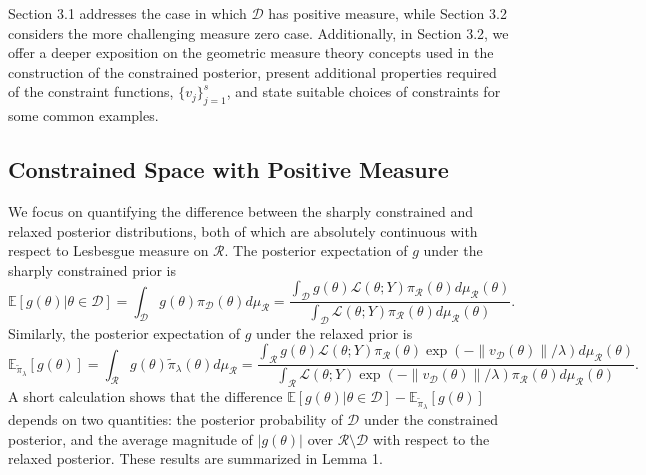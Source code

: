 \documentclass[10pt,fleqn]{article}
\newcommand{\bb}[1]{\mathbb{#1}} \newcommand{\mc}[1]{\mathcal{#1}}
\DeclareMathOperator{\1}{\mathbbm{1}} \DeclareMathOperator{\bigO}{\mc O}
\begin{document}
Section 3.1 addresses the case in which $\mc D$ has positive measure, while Section 3.2 considers the more challenging measure zero case. Additionally, in Section 3.2, we offer a deeper exposition on the geometric measure theory concepts used in the construction of the constrained posterior, present additional properties required of the constraint functions, $\{v_j\}_{j=1}^s$, and state suitable choices of constraints for some common examples.

\subsection{Constrained Space with Positive Measure} \label{SEC:Positive_measure_theory}


We focus on quantifying the difference between the sharply constrained and relaxed posterior distributions, 
both of which are absolutely continuous with respect to Lesbesgue measure on $\mathcal{R}$.  The posterior expectation of $g$ under the sharply constrained prior is 
\begin{equation}
\label{EQ:Expectation_Positive_Measure_Constraint} \bb
E[g(\theta)|\theta\in\mathcal{D}] = \int_\mathcal{D}
g(\theta)\pi_\mathcal{D}(\theta)d\mu_\mathcal{R} =
\frac{\int_\mathcal{D} g(\theta)\mathcal{L}(\theta; Y)
\pi_\mathcal{R}(\theta)d\mu_\mathcal{R}(\theta)}{\int_\mathcal{D}
\mathcal{L}(\theta; Y)
\pi_\mathcal{R}(\theta)d\mu_\mathcal{R}(\theta)}.
\end{equation}
Similarly, the posterior expectation of $g$ under the relaxed prior is
\begin{equation} \label{EQ:Expectation_Positive_Measure_Relaxed}
\bb E_{\tilde{\pi}_\lambda}[g(\theta)] = \int_\mathcal{R}
g(\theta)\tilde{\pi}_\lambda(\theta)d\mu_\mathcal{R} =
\frac{\int_\mathcal{R} g(\theta)\mathcal{L}(\theta; Y)
\pi_\mathcal{R}(\theta)
\exp(-\|v_{\mc
D}(\theta)\|/\lambda)d\mu_\mathcal{R}(\theta)}{\int_\mathcal{R}
\mathcal{L}(\theta; Y)\exp(-\| v_{\mc D}(\theta)\|/\lambda)
\pi_\mathcal{R}(\theta)d\mu_\mathcal{R}(\theta)}.\end{equation}
A short calculation shows that the difference $\bb E[g(\theta)|\theta \in \mc D] - \bb E_{\tilde{\pi}_{\lambda}}[g(\theta)]$ depends on two quantities: the posterior probability of $\mc D$ under the constrained posterior, %
and the average magnitude of $|g(\theta)|$ over $\mc R \setminus \mc D$ with respect to the relaxed posterior. These results are summarized in Lemma 1.
\end{document}
